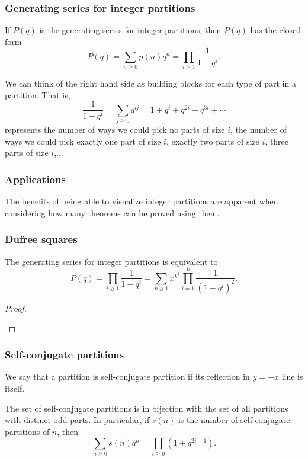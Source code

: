 \documentclass{beamer}
\begin{document}
\begin{frame}
\frametitle{Generating series for integer partitions}

If $P(q)$ is the generating series for integer partitions, then $P(q)$ has the closed form
$$P(q) = \sum_{n\geq0}p(n)q^n = \prod_{i\geq 1}\frac{1}{1-q^i}.$$


We can think of the right hand side as building blocks for each type of part in a partition. That is,
$$\frac{1}{1-q^i} = \sum_{j \geq 0}q^{ij} = 1 + q^i + q^{2i} +q^{3i} +\dotsb $$
represents the number of ways we could pick no parts of size $i$, the number of ways we could pick exactly one part of size $i$, exactly two parts of size $i$, three parts of size $i$,$\ldots$
\end{frame}

\begin{frame}
  \frametitle{Applications}
  The benefits of being able to visualize integer partitions are apparent when considering how many theorems can be proved using them.
\end{frame}

\begin{frame}
	\frametitle{Dufree squares}
\begin{theorem}
The generating series for integer partitions is equivalent to
$$P(q) = \prod_{i\geq 1} \frac{1}{1-q^i} = \sum_{k\geq1}x^{k^2}\prod_{i=1}^{k}\frac{1}{(1-q^i)^2}.$$	
\end{theorem}

\begin{proof}
\begin{center}
\end{center}
\end{proof}
\end{frame}

 
\begin{frame}
	\frametitle{Self-conjugate partitions}
\begin{definition}
We say that a partition is self-conjugate partition if its reflection in $y = -x$ line is itself.	
\end{definition}

\begin{theorem}
The set of self-conjugate partitions is in bijection with the set of all partitions with distinct odd parts. In particular, if $s(n)$ is the number of self conjugate partitions of $n$, then
$$\sum_{n\geq 0}s(n)q^n = \prod_{i\geq 0}(1+q^{2i+1}).$$
\end{theorem}
\end{frame}  
\end{document}
